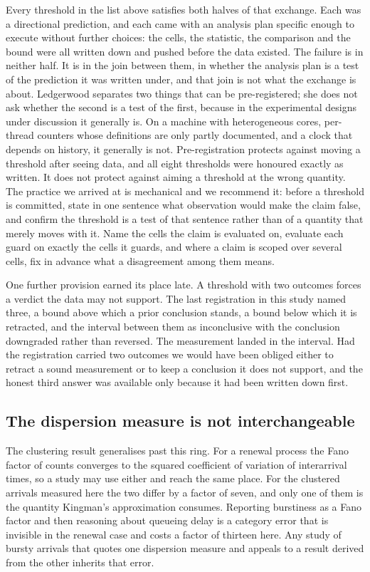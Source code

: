 \documentclass[conference]{IEEEtran}
\begin{document}
Every threshold in the list above satisfies both halves of that exchange. Each
was a directional prediction, and each came with an analysis plan specific
enough to execute without further choices: the cells, the statistic, the
comparison and the bound were all written down and pushed before the data
existed. The failure is in neither half. It is in the join between them, in
whether the analysis plan is a test of the prediction it was written under, and
that join is not what the exchange is about. Ledgerwood separates two things
that can be pre-registered; she does not ask whether the second is a test of the
first, because in the experimental designs under discussion it generally is. On
a machine with heterogeneous cores, per-thread counters whose definitions are
only partly documented, and a clock that depends on history, it generally is
not. Pre-registration protects against moving a threshold after seeing data, and
all eight thresholds were honoured exactly as written. It does not protect
against aiming a threshold at the wrong quantity. The
practice we arrived at is mechanical and we recommend it: before a threshold is
committed, state in one sentence what observation would make the claim false,
and confirm the threshold is a test of that sentence rather than of a quantity
that merely moves with it. Name the cells the claim is evaluated on, evaluate
each guard on exactly the cells it guards, and where a claim is scoped over
several cells, fix in advance what a disagreement among them means.

One further provision earned its place late. A threshold with two outcomes
forces a verdict the data may not support. The last registration in this study
named three, a bound above which a prior conclusion stands, a bound below which
it is retracted, and the interval between them as inconclusive with the
conclusion downgraded rather than reversed. The measurement landed in the
interval. Had the registration carried two outcomes we would have been obliged
either to retract a sound measurement or to keep a conclusion it does not
support, and the honest third answer was available only because it had been
written down first.

\subsection{The dispersion measure is not interchangeable}

The clustering result generalises past this ring. For a renewal process the Fano
factor of counts converges to the squared coefficient of variation of
interarrival times, so a study may use either and reach the same place. For the
clustered arrivals measured here the two differ by a factor of seven, and only
one of them is the quantity Kingman's approximation consumes. Reporting
burstiness as a Fano factor and then reasoning about queueing delay is a
category error that is invisible in the renewal case and costs a factor of
thirteen here. Any study of bursty arrivals that quotes one dispersion measure
and appeals to a result derived from the other inherits that error.
\end{document}
